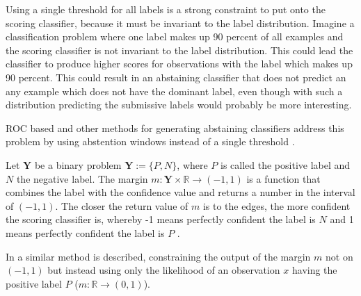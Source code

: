 \documentclass[twoside,11pt]{article}
\def\Y{\textbf{Y}}
\begin{document}
Using a single threshold for all labels is a strong
constraint to put onto the scoring classifier, because it
must be invariant to the label distribution.
Imagine a classification problem where one label makes up
90 percent of all examples and the scoring classifier is
not invariant to the label distribution.
This could lead the classifier to produce higher scores for
observations with the label which makes up 90 percent.
This could result in an abstaining classifier that does not
predict an any example which does not have the dominant
label, even though with such a distribution predicting
the submissive labels would probably be more interesting.

ROC based and other methods for generating abstaining
classifiers address this problem by using abstention
windows instead of a single threshold
\citep[see][]{friedel_et_al_2006}.

Let $\Y$ be a binary problem $\Y := \{P, N\}$,
where $P$ is called the positive label and $N$ the
negative label.
The margin $m: \Y \times \mathbb{R} \rightarrow (-1,1)$ is
a function that combines the label with the confidence
value and returns a number in the interval of $(-1,1)$.
The closer the return value of $m$ is to the edges, the
more confident the scoring classifier is, whereby -1 means
perfectly confident the label is $N$ and 1 means perfectly
confident the label is $P$
\citep[see][]{friedel_et_al_2006}.

In \citet{guan_et_al_2018} a similar method is described,
constraining the output of the margin $m$ not on $(-1,1)$
but instead using only the likelihood of an observation $x$
having the positive label $P$
($m: \mathbb{R} \rightarrow (0,1)$).
\end{document}
